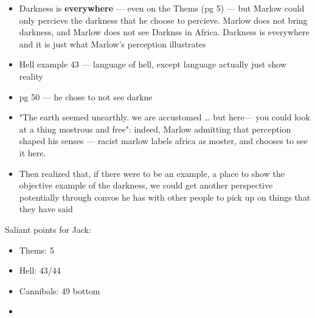 \documentclass[letterpaper]{article}
\begin{document}
\begin{itemize}
\item Darkness is \textbf{everywhere} --- even on the Thems (pg 5) --- but Marlow
could only percieve the darkness that he choose to percieve. Marlow
does not bring darkness, and Marlow does not see Darknss in Africa.
Darkness is everywhere and it is just what Marlow's perception
illustrates
\item Hell example 43 --- language of hell, except language actually just
show reality
\item pg 50 --- he chose to not see darkne
\item "The earth seemed unearthly. we are accustomed \ldots{} but here--- you
could look at a thing mostrous and free": indeed, Marlow admitting
that perception shaped his senses --- racist marlow labels africa as
moster, and chooses to see it here.
\item Then realized that, if there were to be an example, a place to show
the objective example of the darkness, we could get another
perspective potentially through convos he has with other people to
pick up on things that they have said
\end{itemize}

Saliant points for Jack:

\begin{itemize}
\item Thems: 5
\item Hell: 43/44
\item Cannibals: 49 bottom
\item 
\end{itemize}
\end{document}
